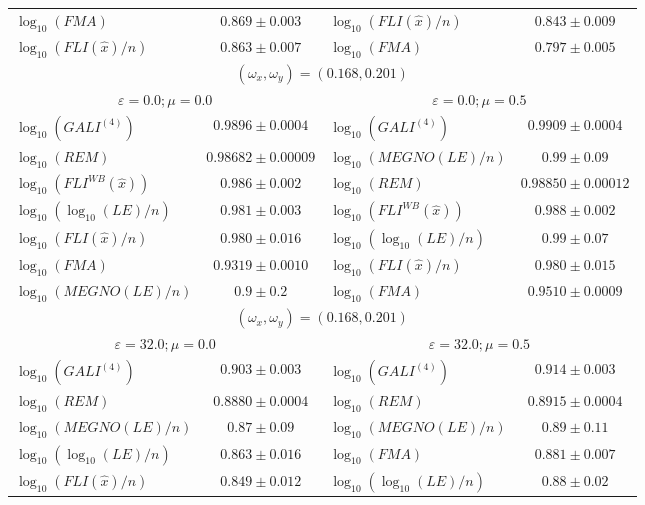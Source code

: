 \begin{table}[htb]
\begin{adjustbox}{width=\textwidth,center}
\begin{tabular}{lc|lc}
        $\log_{{10}}(FMA)$ & $0.869 \pm 0.003$ & $\log_{{10}}(FLI(\hat{{x}})/n)$ & $0.843 \pm 0.009$ \\ 
        $\log_{{10}}(FLI(\hat{{x}})/n)$ & $0.863 \pm 0.007$ & $\log_{{10}}(FMA)$ & $0.797 \pm 0.005$ \\ 
        \hline
        \hline
        \multicolumn{4}{c}{$(\omega_x, \omega_y) = (0.168, 0.201)$} \\
         \multicolumn{2}{c|}{$\varepsilon = 0.0; \mu = 0.0$} & \multicolumn{2}{c}{$\varepsilon = 0.0; \mu = 0.5$} \\
        \hline
        $\log_{{10}}(GALI^{{(4)}})$ & $0.9896 \pm 0.0004$ & $\log_{{10}}(GALI^{{(4)}})$ & $0.9909 \pm 0.0004$ \\ 
        $\log_{{10}}(REM)$ & $0.98682 \pm 0.00009$ & $\log_{{10}}(MEGNO(LE)/n)$ & $0.99 \pm 0.09$ \\ 
        $\log_{{10}}(FLI^{{WB}}(\hat{{x}}))$ & $0.986 \pm 0.002$ & $\log_{{10}}(REM)$ & $0.98850 \pm 0.00012$ \\ 
        $\log_{{10}}(\log_{{10}}(LE)/n)$ & $0.981 \pm 0.003$ & $\log_{{10}}(FLI^{{WB}}(\hat{{x}}))$ & $0.988 \pm 0.002$ \\ 
        $\log_{{10}}(FLI(\hat{{x}})/n)$ & $0.980 \pm 0.016$ & $\log_{{10}}(\log_{{10}}(LE)/n)$ & $0.99 \pm 0.07$ \\ 
        $\log_{{10}}(FMA)$ & $0.9319 \pm 0.0010$ & $\log_{{10}}(FLI(\hat{{x}})/n)$ & $0.980 \pm 0.015$ \\ 
        $\log_{{10}}(MEGNO(LE)/n)$ & $0.9 \pm 0.2$ & $\log_{{10}}(FMA)$ & $0.9510 \pm 0.0009$ \\ 
        \hline
        \multicolumn{4}{c}{$(\omega_x, \omega_y) = (0.168, 0.201)$} \\
         \multicolumn{2}{c|}{$\varepsilon = 32.0; \mu = 0.0$} & \multicolumn{2}{c}{$\varepsilon = 32.0; \mu = 0.5$} \\
        \hline
        $\log_{{10}}(GALI^{{(4)}})$ & $0.903 \pm 0.003$ & $\log_{{10}}(GALI^{{(4)}})$ & $0.914 \pm 0.003$ \\ 
        $\log_{{10}}(REM)$ & $0.8880 \pm 0.0004$ & $\log_{{10}}(REM)$ & $0.8915 \pm 0.0004$ \\ 
        $\log_{{10}}(MEGNO(LE)/n)$ & $0.87 \pm 0.09$ & $\log_{{10}}(MEGNO(LE)/n)$ & $0.89 \pm 0.11$ \\ 
        $\log_{{10}}(\log_{{10}}(LE)/n)$ & $0.863 \pm 0.016$ & $\log_{{10}}(FMA)$ & $0.881 \pm 0.007$ \\ 
        $\log_{{10}}(FLI(\hat{{x}})/n)$ & $0.849 \pm 0.012$ & $\log_{{10}}(\log_{{10}}(LE)/n)$ & $0.88 \pm 0.02$ \\ 

\end{tabular}
\end{adjustbox}
\end{table}
